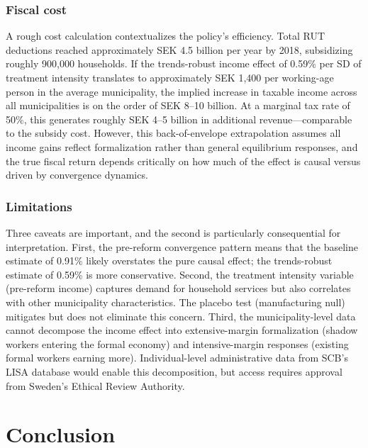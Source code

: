 \documentclass[12pt]{article}
\begin{document}
\subsubsection*{Fiscal cost} A rough cost calculation contextualizes the policy's efficiency. Total RUT deductions reached approximately SEK 4.5 billion per year by 2018, subsidizing roughly 900,000 households. If the trends-robust income effect of 0.59\% per SD of treatment intensity translates to approximately SEK 1,400 per working-age person in the average municipality, the implied increase in taxable income across all municipalities is on the order of SEK 8--10 billion. At a marginal tax rate of 50\%, this generates roughly SEK 4--5 billion in additional revenue---comparable to the subsidy cost. However, this back-of-envelope extrapolation assumes all income gains reflect formalization rather than general equilibrium responses, and the true fiscal return depends critically on how much of the effect is causal versus driven by convergence dynamics.

\subsubsection*{Limitations} Three caveats are important, and the second is particularly consequential for interpretation. First, the pre-reform convergence pattern means that the baseline estimate of 0.91\% likely overstates the pure causal effect; the trends-robust estimate of 0.59\% is more conservative. Second, the treatment intensity variable (pre-reform income) captures demand for household services but also correlates with other municipality characteristics. The placebo test (manufacturing null) mitigates but does not eliminate this concern. Third, the municipality-level data cannot decompose the income effect into extensive-margin formalization (shadow workers entering the formal economy) and intensive-margin responses (existing formal workers earning more). Individual-level administrative data from SCB's LISA database would enable this decomposition, but access requires approval from Sweden's Ethical Review Authority.


\section{Conclusion}
\end{document}
